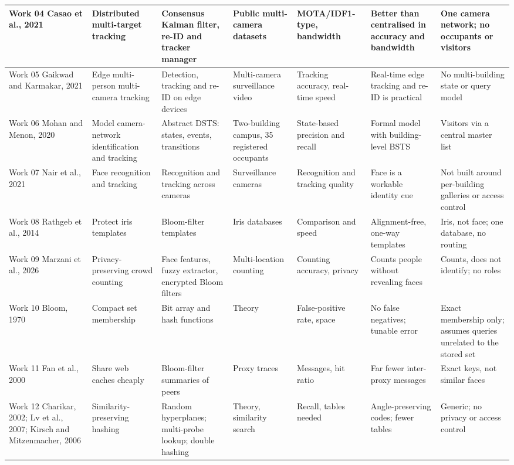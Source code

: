 \documentclass[12pt,a4paper,oneside]{report}
\begin{document}
\begin{landscape}
\begin{longtable}{|p{2.2cm}|p{2.6cm}|p{3.5cm}|p{2.7cm}|p{3.0cm}|p{2.9cm}|p{3.3cm}|}
Work 04 \cite{ref4} Casao et al., 2021 & Distributed multi-target tracking & Consensus Kalman filter, re-ID and tracker manager & Public multi-camera datasets & MOTA/IDF1-type, bandwidth & Better than centralised in accuracy and bandwidth & One camera network; no occupants or visitors\\\hline
Work 05 \cite{ref5} Gaikwad and Karmakar, 2021 & Edge multi-person multi-camera tracking & Detection, tracking and re-ID on edge devices & Multi-camera surveillance video & Tracking accuracy, real-time speed & Real-time edge tracking and re-ID is practical & No multi-building state or query model\\\hline
Work 06 \cite{ref6} Mohan and Menon, 2020 & Model camera-network identification and tracking & Abstract DSTS: states, events, transitions & Two-building campus, 35 registered occupants & State-based precision and recall & Formal model with building-level BSTS & Visitors via a central master list\\\hline
Work 07 \cite{ref8} Nair et al., 2021 & Face recognition and tracking & Recognition and tracking across cameras & Surveillance cameras & Recognition and tracking quality & Face is a workable identity cue & Not built around per-building galleries or access control\\\hline
Work 08 \cite{ref10} Rathgeb et al., 2014 & Protect iris templates & Bloom-filter templates & Iris databases & Comparison and speed & Alignment-free, one-way templates & Iris, not face; one database, no routing\\\hline
Work 09 \cite{ref11} Marzani et al., 2026 & Privacy-preserving crowd counting & Face features, fuzzy extractor, encrypted Bloom filters & Multi-location counting & Counting accuracy, privacy & Counts people without revealing faces & Counts, does not identify; no roles\\\hline
Work 10 \cite{ref12} Bloom, 1970 & Compact set membership & Bit array and hash functions & Theory & False-positive rate, space & No false negatives; tunable error & Exact membership only; assumes queries unrelated to the stored set\\\hline
Work 11 \cite{ref13} Fan et al., 2000 & Share web caches cheaply & Bloom-filter summaries of peers & Proxy traces & Messages, hit ratio & Far fewer inter-proxy messages & Exact keys, not similar faces\\\hline
Work 12 \cite{ref14,ref15,ref16} Charikar, 2002; Lv et al., 2007; Kirsch and Mitzenmacher, 2006 & Similarity-preserving hashing & Random hyperplanes; multi-probe lookup; double hashing & Theory, similarity search & Recall, tables needed & Angle-preserving codes; fewer tables & Generic; no privacy or access control\\\hline
\end{longtable}\endgroup
\end{landscape}
\clearpage
\end{document}
